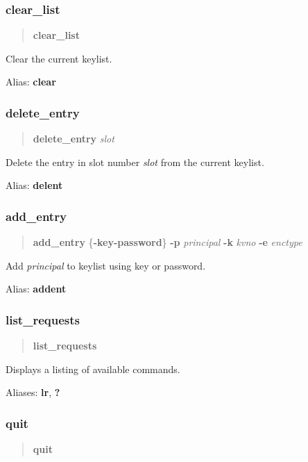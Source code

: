 \documentclass[letterpaper,10pt,english]{sphinxmanual}
\begin{document}
\subsubsection{clear\_list}
\label{admin/admin_commands/ktutil:clear-list}\begin{quote}

\textbf{clear\_list}
\end{quote}

Clear the current keylist.

Alias: \textbf{clear}


\subsubsection{delete\_entry}
\label{admin/admin_commands/ktutil:delete-entry}\begin{quote}

\textbf{delete\_entry} \emph{slot}
\end{quote}

Delete the entry in slot number \emph{slot} from the current keylist.

Alias: \textbf{delent}


\subsubsection{add\_entry}
\label{admin/admin_commands/ktutil:add-entry}\begin{quote}

\textbf{add\_entry} \{\textbf{-key}\textbar{}\textbf{-password}\} \textbf{-p} \emph{principal}
\textbf{-k} \emph{kvno} \textbf{-e} \emph{enctype}
\end{quote}

Add \emph{principal} to keylist using key or password.

Alias: \textbf{addent}


\subsubsection{list\_requests}
\label{admin/admin_commands/ktutil:list-requests}\begin{quote}

\textbf{list\_requests}
\end{quote}

Displays a listing of available commands.

Aliases: \textbf{lr}, \textbf{?}


\subsubsection{quit}
\label{admin/admin_commands/ktutil:quit}\begin{quote}

\textbf{quit}
\end{quote}
\end{document}
